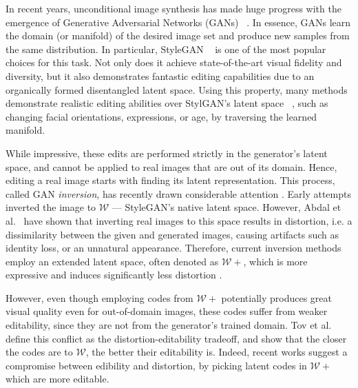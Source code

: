 In recent years, unconditional image synthesis has made huge progress with the emergence of Generative Adversarial Networks (GANs) ~\cite{Goodfellow2014GenerativeAN}. In essence, GANs learn the domain (or manifold) of the desired image set and produce new samples from the same distribution. In particular, StyleGAN ~\cite{karras2019style, karras2020analyzing, Karras2020ada} is one of the most popular choices for this task. Not only does it achieve state-of-the-art visual fidelity and diversity, but it also demonstrates fantastic editing capabilities due to an organically formed disentangled latent space. Using this property, many methods demonstrate realistic editing abilities over StylGAN's latent space ~\cite{collins2020editing, harkonen2020ganspace, shen2020interpreting, tewari2020stylerig, abdal2020styleflow, wu2020stylespace, patashnik2021styleclip}, such as changing facial orientations, expressions, or age, by traversing the learned manifold.

While impressive, these edits are performed strictly in the generator's latent space, and cannot be applied to real images that are out of its domain. Hence, editing a real image starts with finding its latent representation. This process, called GAN \textit{inversion}, has recently drawn considerable attention \cite{abdal2019image2stylegan, zhu2020domain, menon2020pulse, richardson2020encoding, tov2021designing, alaluf-restyle}. Early attempts inverted the image to $\mathcal{W}$ --- StyleGAN's native latent space. However, Abdal et al.~\cite{abdal2019image2stylegan}  have shown that inverting real images to this space results in distortion, i.e. a dissimilarity between the given and generated images, causing artifacts such as identity loss, or an unnatural appearance. Therefore, current inversion methods employ an extended latent space, often denoted as $\mathcal{W}+$, which is more expressive and induces significantly less distortion \cite{abdal2019image2stylegan}. 

However, even though employing codes from $\mathcal{W}+$ potentially produces great visual quality even for out-of-domain images, these codes suffer from weaker editability, since they are not from the generator's trained domain. Tov et al.~\cite{tov2021designing} define this conflict as the distortion-editability tradeoff, and show that the closer the codes are to $\mathcal{W}$, the better their editability is. Indeed, recent works \cite{zhu2020improved, tov2021designing, alaluf-restyle} suggest a compromise between edibility and distortion, by picking latent codes in $\mathcal{W}+$ which are more editable. 

